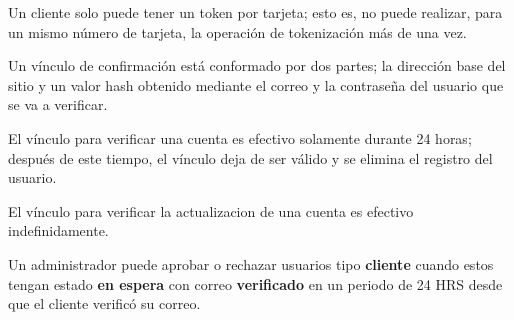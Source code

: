 {
  Un cliente solo puede tener un token por tarjeta; esto es, no puede realizar,
  para un mismo número de tarjeta, la operación de tokenización más de una vez.
}

{
  Un vínculo de confirmación está conformado por dos partes; la dirección base
  del sitio y un valor hash obtenido mediante el correo y la contraseña del
  usuario que se va a verificar.
}

{
  El vínculo para verificar una cuenta es efectivo solamente durante
  24 horas; después de este tiempo, el vínculo deja de ser válido y se elimina
  el registro del usuario.
}

{
  El vínculo para verificar la actualizacion de una cuenta es efectivo
  indefinidamente.
}

{
  Un administrador puede aprobar o rechazar usuarios tipo \textbf{cliente}
  cuando estos tengan estado \textbf{en espera} con correo \textbf{verificado}
  en un periodo de 24 HRS desde que el cliente verificó su correo.
}
